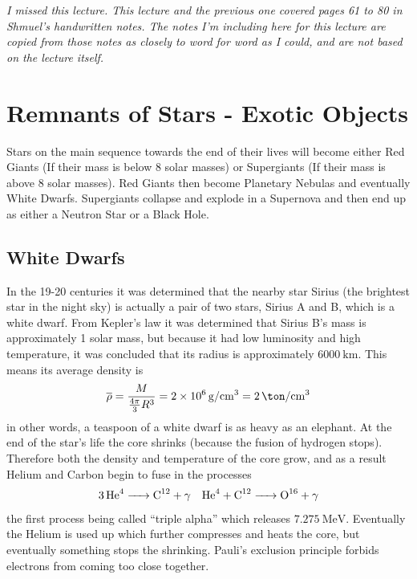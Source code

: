 \emph{I missed this lecture. This lecture and the previous one covered pages 61 to 80 in Shmuel's handwritten notes. The notes I'm including here for this lecture are copied from those notes as closely to word for word as I could, and are not based on the lecture itself.}
\section{Remnants of Stars - Exotic Objects}
Stars on the main sequence towards the end of their lives will become either Red Giants (If their mass is below 8 solar masses) or Supergiants (If their mass is above 8 solar masses). Red Giants then become Planetary Nebulas and eventually White Dwarfs. Supergiants collapse and explode in a Supernova and then end up as either a Neutron Star or a Black Hole.
\subsection{White Dwarfs}
In the 19-20 centuries it was determined that the nearby star Sirius (the brightest star in the night sky) is actually a pair of two stars, Sirius A and B, which is a white dwarf. From Kepler's law it was determined that Sirius B's mass is approximately 1 solar mass, but because it had low luminosity and high temperature, it was concluded that its radius is approximately \(\qty{6000}{\kilo\meter}\). This means its average density is
\begin{equation}
    \overline{\rho} = \frac{M}{\frac{4\pi}{3}R^3} = \qty{2e6}{\gram\per\centi\meter^3}=\qty{2}{\ton\per\centi\meter^3}
\end{equation}
in other words, a teaspoon of a white dwarf is as heavy as an elephant. At the end of the star's life the core shrinks (because the fusion of hydrogen stops). Therefore both the density and temperature of the core grow, and as a result Helium and Carbon begin to fuse in the processes
\begin{align}
    \ce{3He^4 -> C^{12} + \gamma} && \ce{He^4 + C^{12} -> O^{16} + \gamma}
\end{align}
the first process being called ``triple alpha'' which releases \(\qty{7.275}{\mega\electronvolt}\). Eventually the Helium is used up which further compresses and heats the core, but eventually something stops the shrinking. Pauli's exclusion principle forbids electrons from coming too close together.
